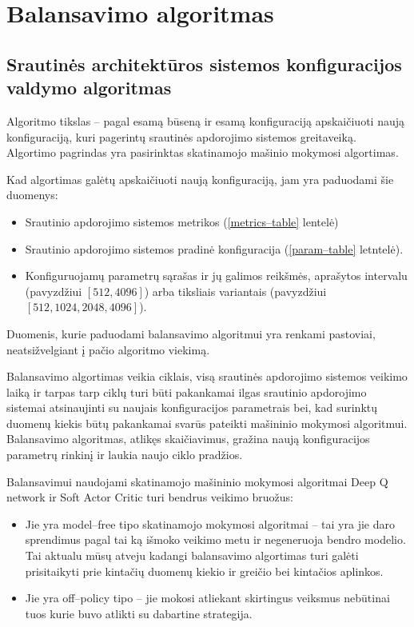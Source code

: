 \documentclass{VUMIFPSbakalaurinis}
\begin{document}
\section{Balansavimo algoritmas}

\subsection{Srautinės architektūros sistemos konfiguracijos valdymo algoritmas}

Algoritmo tikslas – pagal esamą būseną ir esamą konfiguraciją apskaičiuoti naują konfiguraciją, kuri pagerintų srautinės apdorojimo sistemos greitaveiką. Algortimo pagrindas yra pasirinktas skatinamojo mašinio mokymosi algortimas.

Kad algortimas galėtų apskaičiuoti naują konfiguraciją, jam yra paduodami šie duomenys:
\begin{itemize}
    \item Srautinio apdorojimo sistemos metrikos (\ref{metrics–table} lentelė)
    \item Srautinio apdorojimo sistemos pradinė konfiguracija (\ref{param–table} letntelė).
    \item Konfiguruojamų parametrų sąrašas ir jų galimos reikšmės, aprašytos intervalu (pavyzdžiui \([512,4096]\)) arba tiksliais variantais (pavyzdžiui \([512, 1024, 2048, 4096]\)).
\end{itemize}
Duomenis, kurie paduodami balansavimo algoritmui yra renkami pastoviai, neatsižvelgiant į pačio algoritmo viekimą.

Balansavimo algortimas veikia ciklais, visą srautinės apdorojimo sistemos veikimo laiką ir tarpas tarp ciklų turi būti pakankamai ilgas srautinio apdorojimo sistemai atsinaujinti su naujais konfiguracijos parametrais bei, kad surinktų duomenų kiekis būtų pakankamai svarūs pateikti mašininio mokymosi algoritmui. Balansavimo algoritmas, atlikęs skaičiavimus, gražina naują konfiguracijos parametrų rinkinį ir laukia naujo ciklo pradžios. 



Balansavimui naudojami skatinamojo mašininio mokymosi algoritmai Deep Q network ir Soft Actor Critic turi bendrus veikimo bruožus:
\begin{itemize}
    \item Jie yra model–free tipo skatinamojo mokymosi algoritmai – tai yra jie daro sprendimus pagal tai ką išmoko veikimo metu ir negeneruoja bendro modelio. Tai aktualu mūsų atveju kadangi balansavimo algortimas turi galėti prisitaikyti prie kintačių duomenų kiekio ir greičio bei kintačios aplinkos.
    \item Jie yra off–policy tipo – jie mokosi atliekant skirtingus veiksmus nebūtinai tuos kurie buvo atlikti su dabartine strategija.
\end{itemize} 
\end{document}
